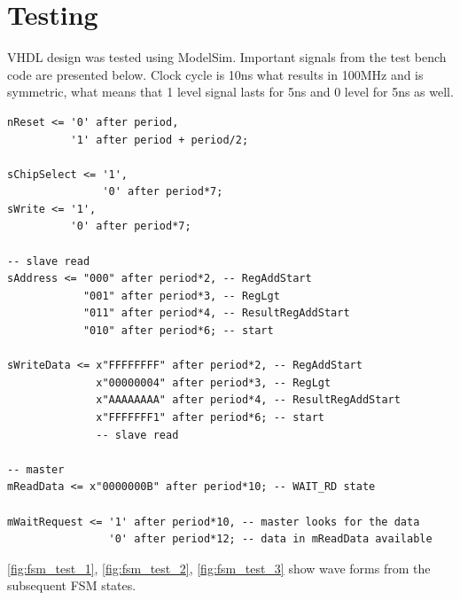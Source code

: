 \section{Testing}
VHDL design was tested using ModelSim. Important signals from the test bench code are presented below. Clock cycle is 10ns what results in 100MHz and is symmetric, what means that 1 level signal lasts for 5ns and 0 level for 5ns as well. 
\begin{verbatim}
nReset <= '0' after period,
          '1' after period + period/2;

sChipSelect <= '1',
               '0' after period*7;
sWrite <= '1',
          '0' after period*7;

-- slave read
sAddress <= "000" after period*2, -- RegAddStart
            "001" after period*3, -- RegLgt
            "011" after period*4, -- ResultRegAddStart
            "010" after period*6; -- start

sWriteData <= x"FFFFFFFF" after period*2, -- RegAddStart
              x"00000004" after period*3, -- RegLgt
              x"AAAAAAAA" after period*4, -- ResultRegAddStart
              x"FFFFFFF1" after period*6; -- start
              -- slave read

-- master 
mReadData <= x"0000000B" after period*10; -- WAIT_RD state

mWaitRequest <= '1' after period*10, -- master looks for the data
                '0' after period*12; -- data in mReadData available 
\end{verbatim}
\figurename{} \ref{fig:fsm_test_1}, \ref{fig:fsm_test_2}, \ref{fig:fsm_test_3} show wave forms from the subsequent FSM states. 


